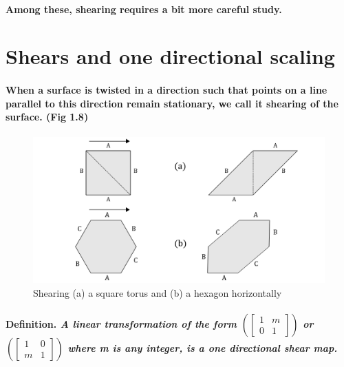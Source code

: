 \documentclass{report}
\begin{document}
\paragraph{Among these, shearing requires a bit more careful study.}



\section{Shears and one directional scaling}


\paragraph{When a surface is twisted in a direction such that points on a line parallel to this direction remain stationary, we call it shearing of the surface. (Fig 1.8)}

\begin{figure} 
\begin{center}
\includegraphics[scale=0.3]{8}
\caption{Shearing (a) a square torus and (b) a hexagon horizontally}
\end{center}
\end{figure}


\paragraph{\textbf{Definition.} \textit{A linear transformation of the form
$ (\begin{bmatrix}
1&m\\0&1
\end{bmatrix})$
or
$ (\begin{bmatrix}
1&0\\m&1
\end{bmatrix})$
where m is any integer, is a one directional shear map.}
}
\end{document}
